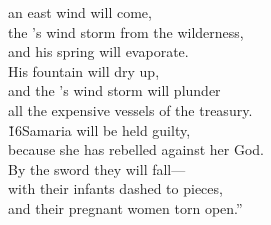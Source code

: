 \begin{poetry}
\poemll    an east wind will come, \\
\poeml the 's wind storm from the wilderness, \\
\poemll    and his spring will evaporate. \\
\poeml His fountain will dry up, \\
\poemll    and the 's wind storm will plunder \\
\poemlll       all the expensive vessels of the treasury. \\
\poeml \v{16}Samaria will be held guilty, \\
\poemll    because she has rebelled against her God. \\
\poeml By the sword they will fall--- \\
\poemll    with their infants dashed to pieces, \\
\poemlll       and their pregnant women torn open.''
\end{poetry}

